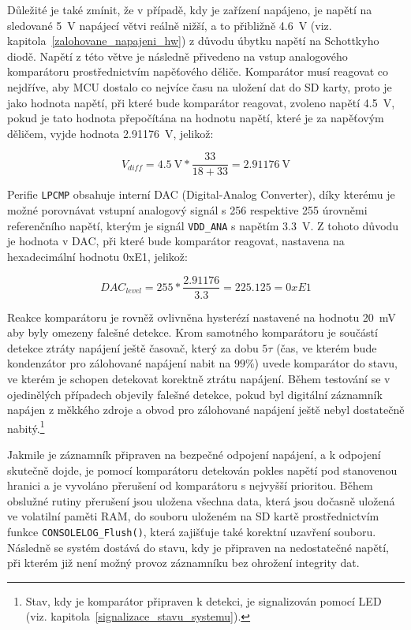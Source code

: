 Důležité je také zmínit, že v případě, kdy je zařízení napájeno, je napětí na sledované \SI{5}{\volt} napájecí větvi reálně nižší, a to přibližně \SI{4.6}{\volt} (viz. kapitola~\ref{zalohovane_napajeni_hw}) z důvodu úbytku napětí na Schottkyho diodě. Napětí z této větve je následně přivedeno na vstup analogového komparátoru prostřednictvím napěťového děliče. Komparátor musí reagovat co nejdříve, aby MCU dostalo co nejvíce času na uložení dat do SD karty, proto je jako hodnota napětí, při které bude komparátor reagovat, zvoleno napětí \SI{4.5}{\volt}, pokud je tato hodnota přepočítána na hodnotu napětí, které je za napěťovým děličem, vyjde hodnota \SI{2.91176}{\volt}, jelikož:

\begin{equation}
    V_{diff} = \SI{4.5}{\volt} * \frac{33}{18 + 33} = \SI{2.91176}{\volt} 
    \label{eq:trigger-cmp-val}
\end{equation}

Perifie \texttt{LPCMP} obsahuje interní DAC (Digital-Analog Converter), díky kterému je možné porovnávat vstupní analogový signál s 256 respektive 255 úrovněmi referenčního napětí, kterým je signál \texttt{VDD\_ANA} s napětím \SI{3.3}{\volt}. Z tohoto důvodu je hodnota v DAC, při které bude komparátor reagovat, nastavena na hexadecimální hodnotu 0xE1, jelikož:

\begin{equation}
    DAC_{level} = 255 * \frac{2.91176}{3.3} = 225.125 = 0xE1
    \label{eq:dac-value}
\end{equation}

Reakce komparátoru je rovněž ovlivněna hysterézí nastavené na hodnotu \SI{20}{\milli\volt} aby byly omezeny falešné detekce. Krom samotného komparátoru je součástí detekce ztráty napájení ještě časovač, který za dobu $5\tau$ (čas, ve kterém bude kondenzátor pro zálohované napájení nabit na $99\%$) uvede komparátor do stavu, ve kterém je schopen detekovat korektně ztrátu napájení. Během testování se v ojedinělých případech objevily falešné detekce, pokud byl digitální záznamník napájen z měkkého zdroje a obvod pro zálohované napájení ještě nebyl dostatečně nabitý.\footnote{Stav, kdy je komparátor připraven k detekci, je signalizován pomocí LED (viz. kapitola~\ref{signalizace_stavu_systemu}).}

Jakmile je záznamník připraven na bezpečné odpojení napájení, a k odpojení skutečně dojde, je pomocí komparátoru detekován pokles napětí pod stanovenou hranici a je vyvoláno přerušení od komparátoru s nejvyšší prioritou. Během obslužné rutiny přerušení jsou uložena všechna data, která jsou dočasně uložená ve volatilní paměti RAM, do souboru uloženém na SD kartě prostřednictvím funkce \texttt{CONSOLELOG\_Flush()}, která zajišťuje také korektní uzavření souboru. Následně se systém dostává do stavu, kdy je připraven na nedostatečné napětí, při kterém již není možný provoz záznamníku bez ohrožení integrity dat.

